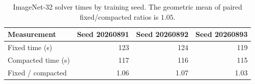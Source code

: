 \begin{table}[!htbp]
\centering
\caption{ImageNet-32 solver times by training seed. The geometric mean of paired fixed/compacted ratios is $1.05$.}
\label{tab:imagenet-solver-pairs}
\small
\setlength{\tabcolsep}{5pt}
\renewcommand{\arraystretch}{1.15}
\begin{tabular}{@{}lrrr@{}}
\toprule
Measurement & Seed 20260891 & Seed 20260892 & Seed 20260893 \\
\midrule
Fixed time (s) & 123 & 124 & 119 \\
Compacted time (s) & 117 & 116 & 115 \\
Fixed / compacted & 1.06 & 1.07 & 1.03 \\
\bottomrule
\end{tabular}
\end{table}
